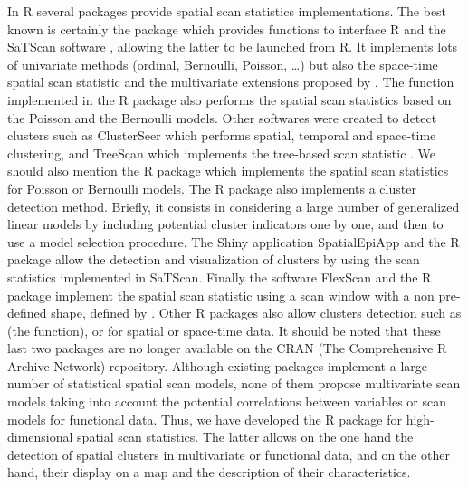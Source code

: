 \noindent In R several packages provide spatial scan statistics implementations. The best known is certainly the  \citep{rsatscan} package which provides functions to interface R and the SaTScan software \citep{satscan}, allowing the latter to be launched from R.  
It implements lots of univariate methods (ordinal, Bernoulli, Poisson, \dots) but also the space-time spatial scan statistic \citep{space-time} and the multivariate extensions proposed by \citet{kulldorffmulti}. The function  implemented in the R package  \citep{spatialepi} also performs the spatial scan statistics based on the Poisson and the Bernoulli models. Other softwares were created to detect clusters such as ClusterSeer \citep{clusterseer1, clusterseer2} which performs spatial, temporal and space-time clustering, and TreeScan \citep{treescan} which implements the tree-based scan statistic \citep{tree}. We should also mention the R package  \citep{DCluster} which implements the spatial scan statistics for Poisson or Bernoulli models. The R package  \citep{JSSv090i14, Dclusterm} also implements a cluster detection method. Briefly, it consists in considering a large number of generalized linear models by including potential cluster indicators one by one, and then to use a model selection procedure.
The Shiny application SpatialEpiApp \citep{spatialepiapp1} and the R package  \citep{SpatialEpiApp} allow the detection and visualization of clusters by using the scan statistics implemented in SaTScan.
Finally the software FlexScan \citep{flexscan} and the R package  \citep{rflexscan} implement the spatial scan statistic using a scan window with a non pre-defined shape, defined by \citet{biv_power}. Other R packages also allow clusters detection such as  \citep{graphscan} (the  function),  \citep{spatclus} or  \citep{scanstatisticsman,scanstatistics} for spatial or space-time data. It should be noted that these last two packages are no longer available on the CRAN (The Comprehensive R Archive Network) repository. Although existing packages implement a large number of statistical spatial scan models, none of them propose multivariate scan models taking into account the potential correlations between variables or scan models for functional data. Thus, we have developed the R package  for high-dimensional spatial scan statistics. The latter allows on the one hand the detection of spatial clusters in multivariate or functional data, and on the other hand, their display on a map and the description of their characteristics.



